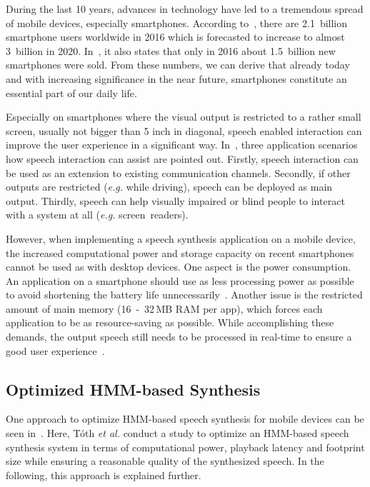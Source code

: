 During the last 10 years, advances in technology have led to a tremendous spread of mobile devices, especially smartphones. According to~\cite{statista:smartphones}, there are 2.1~billion smartphone users worldwide in 2016 which is forecasted to increase to almost 3~billion in 2020. In~\cite{statista:smartphones}, it also states that only in 2016 about 1.5~billion new smartphones were sold. From these numbers, we can derive that already today and with increasing significance in the near future, smartphones constitute an essential part of our daily life.

Especially on smartphones where the visual output is restricted to a rather small screen, usually not bigger than 5 inch in diagonal, speech enabled interaction can improve the user experience in a significant way. In~\cite{toth:optimizing}, three application scenarios how speech interaction can assist are pointed out. Firstly, speech interaction can be used as an extension to existing communication channels. Secondly, if other outputs are restricted (\textit{e.g.} while driving), speech can be deployed as main output. Thirdly, speech can help visually impaired or blind people to interact with a system at all (\textit{e.g.} screen~readers).

However, when implementing a speech synthesis application on a mobile device, the increased computational power and storage capacity on recent smartphones cannot be used as with desktop devices. One aspect is the power consumption. An application on a smartphone should use as less processing power as possible to avoid shortening the battery life unnecessarily~\cite{toth:optimizing}. Another issue is the restricted amount of main memory (16~-~32\,MB RAM per app), which forces each application to be as resource-saving as possible. While accomplishing these demands, the output speech still needs to be processed in real-time to ensure a good user experience~\cite{boros:robust}.

\subsection{Optimized \ac{HMM}-based Synthesis}
\label{subsec:hmmembedded}

One approach to optimize \ac{HMM}-based speech synthesis for mobile devices can be seen in~\cite{toth:optimizing}. Here, T\'oth \textit{et al.} conduct a study to optimize an \ac{HMM}-based speech synthesis system in terms of computational power, playback latency and footprint size while ensuring a reasonable quality of the synthesized speech. In the following, this approach is explained further.

